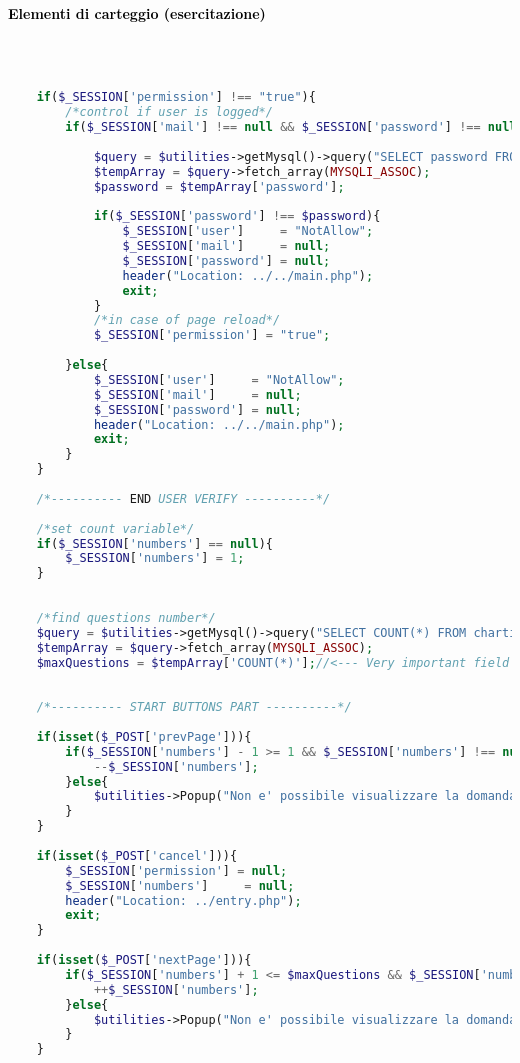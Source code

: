 \paragraph{\textcolor{black}{Elementi di carteggio (esercitazione)}}\leavevmode\\
\raggedright
\begin{lstlisting}[language=php]
	
	if($_SESSION['permission'] !== "true"){
		/*control if user is logged*/
		if($_SESSION['mail'] !== null && $_SESSION['password'] !== null){
			
			$query = $utilities->getMysql()->query("SELECT password FROM user_table1 WHERE (email = '{$_SESSION['mail']}')");
			$tempArray = $query->fetch_array(MYSQLI_ASSOC);
			$password = $tempArray['password'];
			
			if($_SESSION['password'] !== $password){
				$_SESSION['user']     = "NotAllow";
				$_SESSION['mail']     = null;
				$_SESSION['password'] = null;
				header("Location: ../../main.php");
				exit;
			}
			/*in case of page reload*/
			$_SESSION['permission'] = "true";
			
		}else{
			$_SESSION['user']     = "NotAllow";
			$_SESSION['mail']     = null;
			$_SESSION['password'] = null;
			header("Location: ../../main.php");
			exit;
		}
	}
	
	/*---------- END USER VERIFY ----------*/
	
	/*set count variable*/
	if($_SESSION['numbers'] == null){
		$_SESSION['numbers'] = 1;
	}
	
	
	/*find questions number*/
	$query = $utilities->getMysql()->query("SELECT COUNT(*) FROM charting_elements");
	$tempArray = $query->fetch_array(MYSQLI_ASSOC);
	$maxQuestions = $tempArray['COUNT(*)'];//<--- Very important field
	
	
	/*---------- START BUTTONS PART ----------*/
	
	if(isset($_POST['prevPage'])){
		if($_SESSION['numbers'] - 1 >= 1 && $_SESSION['numbers'] !== null){
			--$_SESSION['numbers'];
		}else{
			$utilities->Popup("Non e' possibile visualizzare la domanda precedente");
		}
	}
	
	if(isset($_POST['cancel'])){
		$_SESSION['permission'] = null;
		$_SESSION['numbers']     = null;
		header("Location: ../entry.php");
		exit;
	}
	
	if(isset($_POST['nextPage'])){
		if($_SESSION['numbers'] + 1 <= $maxQuestions && $_SESSION['numbers'] !== null){
			++$_SESSION['numbers'];
		}else{
			$utilities->Popup("Non e' possibile visualizzare la domanda successiva");
		}
	}
	

\end{lstlisting}
